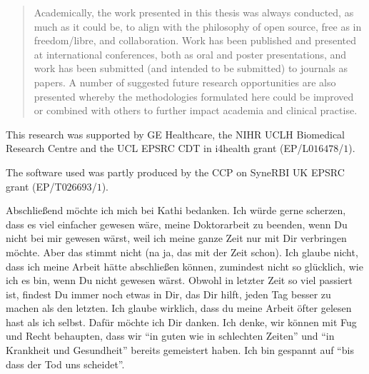 \begin{impactstatement}
\begin{quote}
        Academically, the work presented in this thesis was always conducted, as much as it could be, to align with the philosophy of open source, free as in freedom/libre, and collaboration. Work has been published and presented at international conferences, both as oral and poster presentations, and work has been submitted (and intended to be submitted) to journals as papers. A number of suggested future research opportunities are also presented whereby the methodologies formulated here could be improved or combined with others to further impact academia and clinical practise.
    \end{quote}
\end{impactstatement}

\begin{acknowledgements}
    This research was supported by \gls{GE} Healthcare, the \gls{NIHR} \gls{UCLH} Biomedical Research Centre and the \gls{UCL} \gls{EPSRC} \gls{CDT} in \gls{i4health} grant (EP/L$016478$/$1$).
    
    The software used was partly produced by the \gls{CCP} on \gls{SyneRBI} \gls{UK} \gls{EPSRC} grant (EP/T$026693$/$1$).

    Abschließend möchte ich mich bei Kathi bedanken. Ich würde gerne scherzen, dass es viel einfacher gewesen wäre, meine Doktorarbeit zu beenden, wenn Du nicht bei mir gewesen wärst, weil ich meine ganze Zeit nur mit Dir verbringen möchte. Aber das stimmt nicht (na ja, das mit der Zeit schon). Ich glaube nicht, dass ich meine Arbeit hätte abschließen können, zumindest nicht so glücklich, wie ich es bin, wenn Du nicht gewesen wärst. Obwohl in letzter Zeit so viel passiert ist, findest Du immer noch etwas in Dir, das Dir hilft, jeden Tag besser zu machen als den letzten. Ich glaube wirklich, dass du meine Arbeit öfter gelesen hast als ich selbst. Dafür möchte ich Dir danken. Ich denke, wir können mit Fug und Recht behaupten, dass wir ``in guten wie in schlechten Zeiten'' und ``in Krankheit und Gesundheit'' bereits gemeistert haben. Ich bin gespannt auf ``bis dass der Tod uns scheidet''.

    

\end{acknowledgements}
